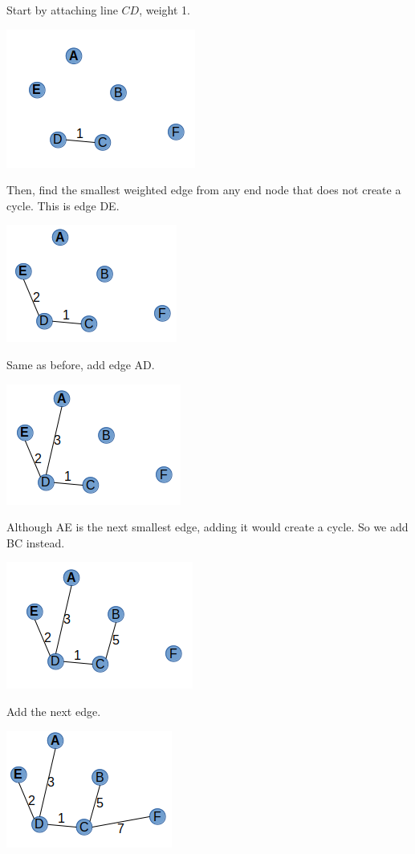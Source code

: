 \documentclass{article}
\begin{document}
Start by attaching line $CD$, weight 1. 

\includegraphics[scale=0.5]{./P13/kruskals/1}

Then, find the smallest weighted edge from any end node that does not create a cycle. This is edge DE. 

\includegraphics[scale=0.5]{./P13/kruskals/2}

Same as before, add edge AD. 

\includegraphics[scale=0.5]{./P13/kruskals/3}

Although AE is the next smallest edge, adding it would create a cycle. So we add BC instead. 

\includegraphics[scale=0.5]{./P13/kruskals/4}

Add the next edge. 

\includegraphics[scale=0.5]{./P13/kruskals/5}
\end{document}
